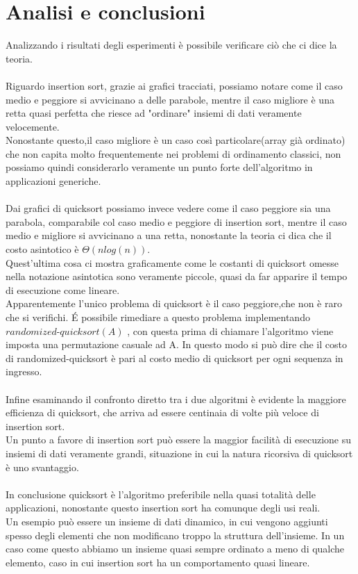 \documentclass[]{article}
\begin{document}
\section{Analisi e conclusioni}
Analizzando i risultati degli esperimenti è possibile verificare ciò che ci dice la teoria.\\\\
Riguardo insertion sort, grazie ai grafici tracciati, possiamo notare come il caso medio e peggiore si avvicinano a delle parabole, mentre il caso migliore è una retta quasi perfetta che riesce ad "ordinare" insiemi di dati veramente velocemente.\\
Nonostante questo,il caso migliore è un caso così particolare(array già ordinato) che non capita molto frequentemente nei problemi di ordinamento classici, non possiamo quindi considerarlo veramente un punto forte dell'algoritmo in applicazioni generiche.\\\\
Dai grafici di quicksort possiamo invece vedere come il caso peggiore sia una parabola, comparabile col caso medio e peggiore di insertion sort, mentre il caso medio e migliore si avvicinano a una retta, nonostante la teoria ci dica che il costo asintotico è $\Theta(nlog(n))$.\\
Quest'ultima cosa ci mostra graficamente come le costanti di quicksort omesse nella notazione asintotica sono veramente piccole, quasi da far apparire il tempo di esecuzione come lineare.\\
Apparentemente l'unico problema di quicksort è il caso peggiore,che non è raro che si verifichi. \'E possibile rimediare a questo problema implementando $randomized\mbox{-}quicksort(A)$ , con questa prima di chiamare l'algoritmo viene imposta una permutazione casuale ad A. In questo modo si può dire che il costo di randomized-quicksort è pari al costo medio di quicksort per ogni sequenza in ingresso.\\\\
Infine esaminando il confronto diretto tra i due algoritmi è evidente la maggiore efficienza di quicksort, che arriva ad essere centinaia di volte più veloce di insertion sort.\\
Un punto a favore di insertion sort può essere la maggior facilità di esecuzione su insiemi di dati veramente grandi, situazione in cui la natura ricorsiva di quicksort è uno svantaggio.\\\\
In conclusione quicksort è l'algoritmo preferibile nella quasi totalità delle applicazioni, nonostante questo insertion sort ha comunque degli usi reali.\\
Un esempio può essere un insieme di dati dinamico, in cui vengono aggiunti spesso degli elementi che non modificano troppo la struttura dell'insieme. In un caso come questo abbiamo un insieme quasi sempre ordinato a meno di qualche elemento, caso in cui insertion sort ha un comportamento quasi lineare.
\end{document}
